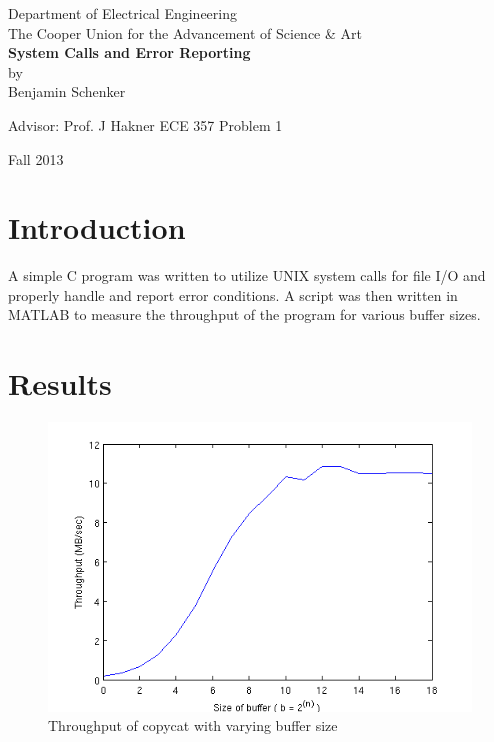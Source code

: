 \documentclass[titlepage,12pt]{article}
\begin{document}
\begin{titlepage}
\begin{center}

{\large Department of Electrical Engineering}\\
{\Large The Cooper Union for the Advancement of Science \& Art} \\[7cm]



{ \huge \bfseries System Calls and Error Reporting}\\[1.5cm]


{\Large by\\[.5cm]}
{\large Benjamin Schenker}
\end{center}



\vfill






{\large Advisor: Prof. J Hakner \hfill ECE 357 Problem 1}

\begin{center} 
{\large Fall 2013}
\end{center}


\end{titlepage}
\doublespacing
\section{Introduction}
A simple C program was written to utilize UNIX system calls for file I/O and properly handle and report error conditions.  A script was then written in MATLAB to measure the throughput of the program for various buffer sizes.
\section{Results}
\begin{figure}[H]
\centering
\includegraphics[scale = 1.2]{chart.png}
\caption{Throughput of copycat with varying buffer size}
\label{chart}
\end{figure}
\end{document}
